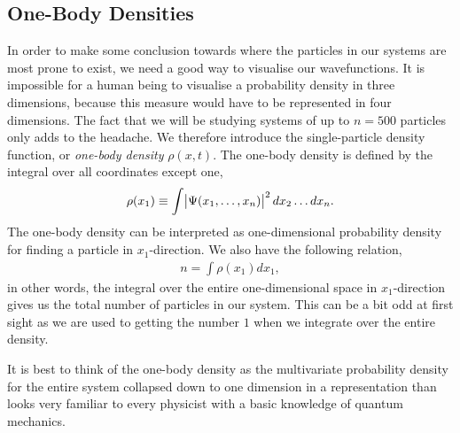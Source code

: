 \documentclass[
    a4paper, aps, twocolumn, floatfix, superscriptaddress,
    nofootinbib]{revtex4-1}
\newcommand{\1}{\mathds{1}}
\begin{document}
    \subsection{One-Body Densities}
        In order to make some conclusion towards where the particles in our systems
        are most prone to exist, we need a good way to visualise our wavefunctions.        
        It is impossible for a human being to visualise a probability density in three dimensions, 
        because this measure would have to be represented in four dimensions. The fact that
        we will be studying systems of up to $n=500$ particles only adds to the headache.
        We therefore introduce the single-particle density function, or \emph{one-body density}
        $\rho(x, t)$. The one-body density is defined by the integral over all coordinates
        except one,
        \begin{align}
        		\rho(x_1) \equiv \int \abs{\Psi(x_1, \dots, x_n)}^2 dx_2 \dots dx_n.
        \end{align}
        The one-body density can be interpreted as one-dimensional probability density for
        finding a particle in $x_1$-direction. We also have the following relation,
        \begin{align}
        		n = \int \rho(x_1)dx_1,
        \end{align}
        in other words, the integral over the entire one-dimensional space in $x_1$-direction
        gives us the total number of particles in our system. This can be a bit odd at first sight
        as we are used to getting the number $1$ when we integrate over the entire density.
        
        It is best to think of the one-body density as the multivariate probability density
        for the entire system collapsed down to one dimension in a representation than looks very 
        familiar to every physicist with a basic knowledge of quantum mechanics.
\end{document}
